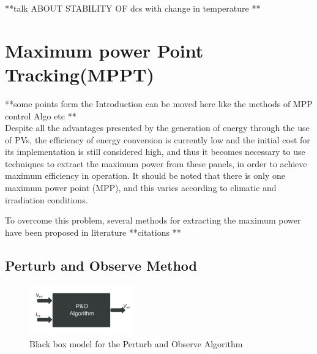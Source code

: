 {**talk ABOUT STABILITY OF dcs with change in temperature **

\section{Maximum power Point Tracking(MPPT)}

**some points form the Introduction can be moved here like the methods of MPP control Algo etc ** \\

Despite all the advantages presented by the generation of energy through the use of PVs, the efficiency of energy conversion is currently low and the initial cost for its implementation is still considered high, and thus it becomes necessary to use techniques to extract the maximum power from these panels, in order to achieve maximum efficiency in operation. It should be noted that there is only one maximum power point (MPP), and this varies according to climatic and irradiation conditions\cite{eltawil2013mppt}.

To overcome this problem, several methods for extracting the maximum power have been proposed in literature **citations **

\subsection{Perturb and Observe Method }


    \begin{figure}[H]
       \begin{center}
       \includegraphics[width=0.4\textwidth]{images/PnO_block}
       \caption{ Black box model for the Perturb and Observe Algorithm }
       \label{fig:PnO_block}
       \end{center}
       \end{figure}
       
}
